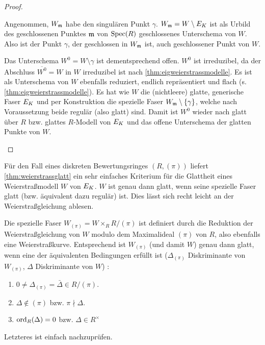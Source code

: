 \documentclass[german]{scrreprt}
\begin{document}
\begin{Lemma}
\begin{proof}
\begin{enumerate}[label=(\alph*)]
      Angenommen, $W_{\mathfrak{m}}$ habe den singulären Punkt $\gamma$.
      $W_{\mathfrak{m}}=W\setminus E_{K}$ ist als Urbild des geschlossenen Punktes
      $\mathfrak{m}$ von $\operatorname{Spec}(R)$ geschlossenes Unterschema von $W$.
      Also ist der Punkt $\gamma$, der geschlossen in $W_{\mathfrak{m}}$ ist, auch
      geschlossener Punkt von $W$.
      
      Das Unterschema $W^0=W\setminus\gamma$ ist dementsprechend offen.
      $W^0$ ist irreduzibel, da der Abschluss $\overline{W^0}=W$ in
      $W$ irreduzibel ist nach \autoref{thm:eigweierstrassmodelle}.
      Es ist als Unterschema von $W$ ebenfalls reduziert, endlich
      repräsentiert und flach (s. \autoref{thm:eigweierstrassmodelle}).
      Es hat wie $W$ die (nichtleere) glatte, generische Faser $E_{K}$ und
      per Konstruktion die spezielle Faser $W_{\mathfrak{m}}\setminus\{\gamma\}$,
      welche nach Voraussetzung beide regulär (also glatt) sind.
      Damit ist $W^0$ wieder nach \cite[8.5, Proposition 17]{bosch}
      glatt über $R$ bzw. glattes $R$-Modell von $E_{K}$ und das offene
      Unterschema der glatten Punkte von $W$.
    \end{enumerate}
  \end{proof}
\end{Lemma}


\begin{Bemerkung}\label{thm:weierstraßmodellglatt}
  Für den Fall eines diskreten Bewertungsringes $(R,(\pi))$ liefert
  \autoref{thm:weierstrassglatt} ein sehr einfaches Kriterium für die
  Glattheit eines Weierstraßmodell $W$ von $E_{K}$.
  $W$ ist genau dann glatt, wenn seine spezielle Faser glatt
  (bzw. äquivalent dazu regulär) ist.
  Dies lässt sich recht leicht an der Weierstraßgleichung ablesen.
  
  Die spezielle Faser $W_{(\pi)}=W\times_R R/(\pi)$ ist definiert
  durch die Reduktion der Weierstraßgleichung von $W$ modulo dem
  Maximalideal $(\pi)$ von $R$, also ebenfalls eine Weierstraßkurve.
  Entsprechend ist $W_{(\pi)}$ (und damit $W$) genau dann glatt, wenn
  eine der äquivalenten Bedingungen erfüllt ist
  ($\Delta_{(\pi)}$ Diskriminante von $W_{(\pi)}$,
  $\Delta$ Diskriminante von $W$)
  \cite[Proposition VII.5.1 (a)]{silverman}:
  \begin{enumerate}[label=(\roman*)]
  \item $0\neq\Delta_{(\pi)}=\bar\Delta\in R/(\pi)$.
  \item $\Delta\not\in(\pi)$ bzw. $\pi\nmid\Delta$.
  \item $\operatorname{ord}_R(\Delta)=0$ bzw. $\Delta\in R^\times$
  \end{enumerate}
  Letzteres ist einfach nachzuprüfen.
\end{Bemerkung}
\end{document}
